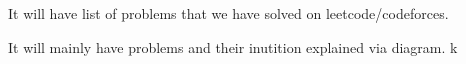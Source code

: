 

It will have list of problems that we have solved on leetcode/codeforces.

It will mainly have problems and their inutition explained via diagram.
k











